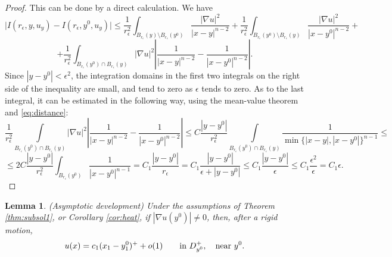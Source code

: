 \documentclass[11pt,reqno]{amsart}
\theoremstyle{plain}
\newtheorem{lem}[thm]{Lemma}
\theoremstyle{remark}
\numberwithin{equation}{section}
\begin{document}
\begin{proof}
This can be done by a direct calculation. We have 
$$
\Big| I(r_\epsilon,y,u_{y}) -  I(r_\epsilon,y^0,u_y)| \le
\frac{1}{r_\epsilon^2 }\int_{B_{r_\epsilon} (y) \setminus 
B_{r_\epsilon} (y^0)}  \frac{|\nabla u|^2}{|x-y|^{n-2}} + 
\frac{1}{r_\epsilon^2 }\int_{B_{r_\epsilon} (y^0) \setminus 
B_{r_\epsilon} (y)}  \frac{|\nabla u|^2}{|x-y^0|^{n-2}}
+
$$
$$
+\frac{1}{r_\epsilon^2 }\int_{B_{r_\epsilon} (y^0) \cap 
B_{r_\epsilon} (y)} |\nabla u|^2\left|\frac{1}{|x-y|^{n-2}}- \frac{1}{|x-y^0|^{n-2}}\right|.
$$
Since $|y -y^0 | < \epsilon^2$,  the  integration domains in 
the first two integrals on the right side of the inequality are small, and tend to zero as $\epsilon $ tends to zero.
 As to the last integral, it can be estimated in the following way, using the mean-value theorem and \eqref{eq:distance}:
$$
\frac{1}{r_\epsilon^2 }\int\limits_{B_{r_\epsilon} (y^0) \cap 
B_{r_\epsilon} (y)} |\nabla u|^2\left|\frac{1}{|x-y|^{n-2}}- \frac{1}{|x-y^0|^{n-2}}\right| \le C  \frac{|y-y^0|}{r_\epsilon^2 }\int\limits_{B_{r_\epsilon} (y^0) \cap 
B_{r_\epsilon} (y)} \frac{1}{\min\{|x-y|, |x-y^0|\}^{n-1}}\le 
$$
$$
\le 2C
\frac{|y-y^0|}{r_\epsilon^2 }\int_{B_{r_\epsilon} (y^0)} \frac{1}{|x-y^0|^{n-1}} =  C_1\frac{|y-y^0|}{r_\epsilon} = 
C_1\frac{|y-y^0|}{\epsilon+|y-y^0|}\le C_1\frac{|y-y^0|}{\epsilon}\le C_1\frac{\epsilon^2}{\epsilon} = C_1\epsilon. 
$$

\end{proof}



\begin{lem}\label{lem:asymptot}(Asymptotic development)
Under the assumptions of Theorem \ref{thm:subsol1}, or Corollary \ref{cor:heat}, if 
 $|\nabla u (y^0)|\neq 0$,  
  then, after a rigid motion, 
\begin{equation}\label{eq:asymptotic2}
    u(x) = c_1(x_1 -y_1^0)^+ + o(1) \qquad \hbox{in } D^+_{y^0} , \quad \hbox{near } y^0.
    \end{equation} 
\end{lem}
\end{document}
